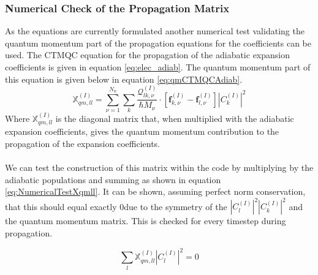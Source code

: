 \subsubsection{Numerical Check of the Propagation Matrix}
\label{sect:sumXqmll}
As the equations are currently formulated another numerical test validating the quantum momentum part of the propagation equations for the coefficients can be used. The CTMQC equation for the propagation of the adiabatic expansion coefficients is given in equation \eqref{eq:elec_adiab}. The quantum momentum part of this equation is given below in equation \eqref{eq:qmCTMQCAdiab}. 
\begin{equation}
  \mathbb{X}_{qm, ll}^{(I)} = \sum_{\nu=1}^{N_n}\sum_{k} \frac{\mathcal{Q}_{lk, \nu}^{(I)}}{\hbar     M_\nu} \cdot \left[ \mathbf{f}_{k,\nu}^{(I)} - \mathbf{f}_{l,\nu}^{(I)}   \right] |C_{k}^{(I)}|^2
  \label{eq:qmCTMQCAdiab}
\end{equation}
Where $\mathbb{X}_{qm, ll}^{(I)}$ is the diagonal matrix that, when multiplied with the adiabatic expansion coefficients, gives the quantum momentum contribution to the propagation of the expansion coefficients.
\\\\
We can test the construction of this matrix within the code by multiplying by the adiabatic populations and summing as shown in equation \eqref{eq:NumericalTestXqmll}. It can be shown, assuming perfect norm conservation, that this should equal exactly 0due to the symmetry of the $|C_{l}^{(I)}|^2|C_{k}^{(I)}|^2$ and the quantum momentum matrix. This is checked for every timestep during propagation.

\begin{equation}
  \sum_{l} \mathbb{X}_{qm, ll}^{(I)} |C_{l}^{(I)}|^2 = 0
  \label{eq:NumericalTestXqmll}
\end{equation}


